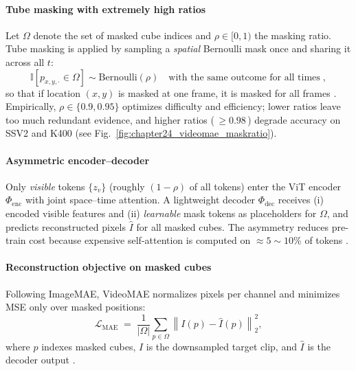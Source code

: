 \begin{enrichment}
\begin{enrichment}
    \paragraph{Tube masking with extremely high ratios}
    Let $\Omega$ denote the set of masked cube indices and $\rho \in [0,1)$ the masking ratio. Tube masking is applied by sampling a \emph{spatial} Bernoulli mask once and sharing it across all $t$:
    \begin{equation}
    \label{eq:chapter24_videomae_tube}
    \mathbb{I}[p_{x,y,\cdot} \in \Omega] \sim \mathrm{Bernoulli}(\rho)\quad\text{with the same outcome for all times}\;,
    \end{equation}
    so that if location $(x,y)$ is masked at one frame, it is masked for all frames \cite{tong2022_videomae}. Empirically, $\rho \in \{0.9,0.95\}$ optimizes difficulty and efficiency; lower ratios leave too much redundant evidence, and higher ratios (\,$\geq 0.98$\,) degrade accuracy on SSV2 and K400 (see Fig.~\ref{fig:chapter24_videomae_maskratio}). 
    
    \paragraph{Asymmetric encoder–decoder}
    Only \emph{visible} tokens $\{z_v\}$ (roughly $(1{-}\rho)$ of all tokens) enter the ViT encoder $\Phi_{\text{enc}}$ with joint space–time attention. A lightweight decoder $\Phi_{\text{dec}}$ receives (i) encoded visible features and (ii) \emph{learnable} mask tokens as placeholders for $\Omega$, and predicts reconstructed pixels $\hat{I}$ for all masked cubes. The asymmetry reduces pre-train cost because expensive self-attention is computed on $\approx 5{\sim}10\%$ of tokens \cite{tong2022_videomae}. 
    
    \paragraph{Reconstruction objective on masked cubes}
    Following ImageMAE, VideoMAE normalizes pixels per channel and minimizes MSE only over masked positions:
    \begin{equation}
    \label{eq:chapter24_videomae_loss}
    \mathcal{L}_{\mathrm{MAE}} \;=\; \frac{1}{|\Omega|}\sum_{p \in \Omega} \left\| I(p) - \hat{I}(p) \right\|_2^2,
    \end{equation}
    where $p$ indexes masked cubes, $I$ is the downsampled target clip, and $\hat{I}$ is the decoder output \cite{tong2022_videomae}. 
    

\end{enrichment}
\end{enrichment}
